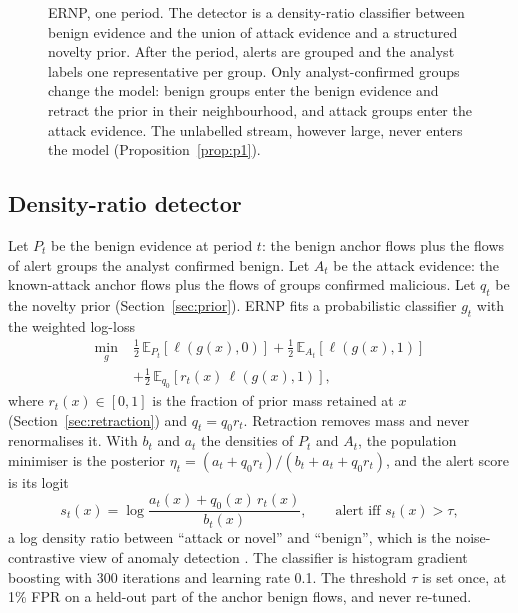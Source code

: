 \documentclass[a4paper,fleqn]{cas-dc}
\newcommand{\ERNP}{ERNP\xspace}
\newcommand{\E}{\mathcal{E}}
\begin{document}
\begin{figure}[t]
\caption{\ERNP, one period. The detector is a density-ratio classifier between benign evidence and the union of attack evidence and a structured novelty prior. After the period, alerts are grouped and the analyst labels one representative per group. Only analyst-confirmed groups change the model: benign groups enter the benign evidence and retract the prior in their neighbourhood, and attack groups enter the attack evidence. The unlabelled stream, however large, never enters the model (Proposition~\ref{prop:p1}).}
\label{fig:overview}
\end{figure}

\subsection{Density-ratio detector}
Let $P_t$ be the benign evidence at period $t$: the benign anchor flows plus the flows of alert groups the analyst confirmed benign. Let $A_t$ be the attack evidence: the known-attack anchor flows plus the flows of groups confirmed malicious. Let $q_t$ be the novelty prior (Section~\ref{sec:prior}). \ERNP fits a probabilistic classifier $g_t$ with the weighted log-loss
\begin{equation}
\begin{aligned}
\min_g\;& \tfrac12\,\mathbb{E}_{P_t}[\ell(g(x),0)] + \tfrac12\,\mathbb{E}_{A_t}[\ell(g(x),1)]\\
&+ \tfrac12\,\mathbb{E}_{q_0}\!\left[r_t(x)\,\ell(g(x),1)\right],
\end{aligned}
\label{eq:loss}
\end{equation}
where $r_t(x)\in[0,1]$ is the fraction of prior mass retained at $x$ (Section~\ref{sec:retraction}) and $q_t=q_0 r_t$. Retraction removes mass and never renormalises it. With $b_t$ and $a_t$ the densities of $P_t$ and $A_t$, the population minimiser is the posterior $\eta_t=(a_t+q_0r_t)/(b_t+a_t+q_0r_t)$, and the alert score is its logit
\begin{equation}
s_t(x)=\log\frac{a_t(x)+q_0(x)\,r_t(x)}{b_t(x)},\qquad \text{alert iff } s_t(x)>\tau,
\label{eq:score}
\end{equation}
a log density ratio between ``attack or novel'' and ``benign'', which is the noise-contrastive view of anomaly detection \cite{steinwart2005classification,gutmann2010nce}. The classifier is histogram gradient boosting \cite{friedman2001gbm,pedregosa2011sklearn} with 300 iterations and learning rate 0.1. The threshold $\tau$ is set once, at 1\% FPR on a held-out part of the anchor benign flows, and never re-tuned.
\end{document}
